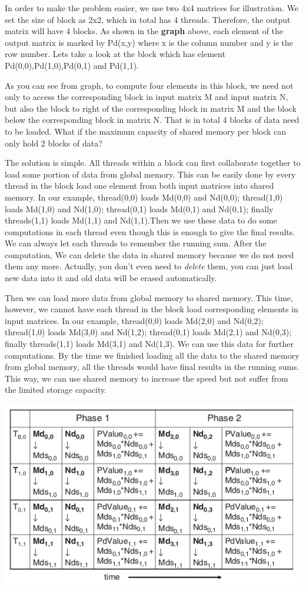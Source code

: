 \documentclass[letterpaper,10pt,english]{sphinxmanual}
\begin{document}
In order to make the problem easier, we use two 4x4 matrices for illustration. We set the size of block as 2x2, which in total has 4 threads. Therefore, the output matrix will have 4 blocks. As shown in the \textbf{graph} above, each element of the output matrix is marked by Pd(x,y) where x is the column number and y is the row number. Lets take a look at the block which has element Pd(0,0),Pd(1,0),Pd(0,1) and Pd(1,1).

As you can see from graph, to compute four elements in this block, we need not only to access the corresponding block in input matrix M and input matrix N, but also the block to right of the corresponding block in matrix M and the block below the corresponding block in matrix N. That is in total 4 blocks of data need to be loaded. What if the maximum capacity of shared memory per block can only hold 2 blocks of data?

The solution is simple. All threads within a block can first collaborate together to load some portion of data from global memory. This can be easily done by every thread in the block load one element from both input matrices into shared memory. In our example, thread(0,0) loads Md(0,0) and Nd(0,0); thread(1,0) loads Md(1,0) and Nd(1,0); thread(0,1) loads Md(0,1) and Nd(0,1); finally threads(1,1) loads Md(1,1) and Nd(1,1).Then we use these data to do some computations in each thread even though this is enough to give the final results. We can always let each threads to remember the running sum. After the computation, We can delete the data in shared memory because we do not need them any more. Actually, you don't even need to \emph{delete} them, you can just load new data into it and old data will be erased automatically.

Then we can load more data from global memory to shared memory. This time, however, we cannot have each thread in the block load corresponding elements in input matrices. In our example, thread(0,0) loads Md(2,0) and Nd(0,2); thread(1,0) loads Md(3,0) and Nd(1,2); thread(0,1) loads Md(2,1) and Nd(0,3); finally threads(1,1) loads Md(3,1) and Nd(1,3). We can use this data for further computations. By the time we finished loading all the data to the shared memory from global memory, all the threads would have final results in the running sums. This way, we can use shared memory to increase the speed but not suffer from the limited storage capacity.

{\hfill\includegraphics{MMSM2.png}\hfill}
\end{document}
